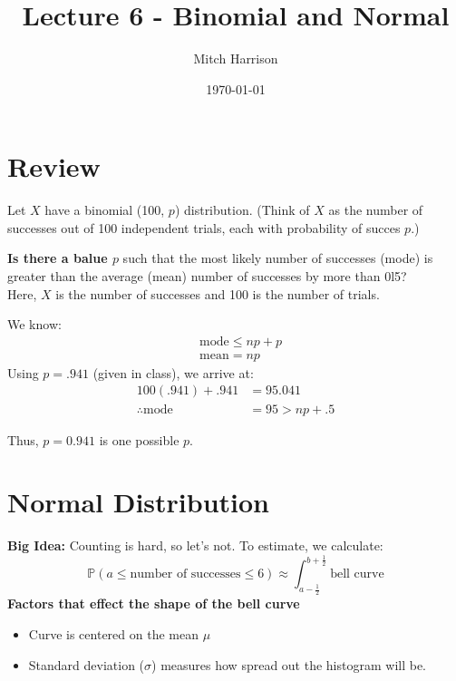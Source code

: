 \documentclass[titlepage, 12pt, leqno]{article}
\title{\Huge{Lecture 6 - Binomial and Normal}}
\author{\large{Mitch Harrison}}
\date{\today}
\begin{document}
\setlength{\parskip}{1\baselineskip}
\setlength{\parindent}{15pt}
\maketitle
\tableofcontents
\newpage


\section{Review}
\begin{ex}
    Let $X$ have a binomial (100, $p$) distribution. (Think of $X$ as the number of successes out of 100 independent trials, each with probability of succes $p$.)

    \textbf{Is there a balue $p$} such that the most likely number of successes (mode) is greater than the average (mean) number of successes by more than 0l5?\\[.1in]
   Here, $X$ is the number of successes and 100 is the number of trials. 
   
   We know:
  \begin{align*}
      &\text{mode} \le np+p \\
      &\text{mean} = np
  \end{align*}
  Using $p = .941$ (given in class), we arrive at:
    \begin{align*}
     100(.941) + .941 &= 95.041 \\
     \therefore \text{mode} &= 95 > np + .5
    \end{align*}
    
    Thus, $\boxed{p = 0.941}$ is one possible $p$.
\end{ex}

\pagebreak
\section{Normal Distribution}
\textbf{Big Idea:} Counting is hard, so let's not.
To estimate, we calculate:
\[
\mathbb{P}(a \le \text{number of successes} \le 6) \approx \int_{a-\frac{1}{2} }^{b + \frac{1}{2} } \text{bell curve}
\]
\textbf{Factors that effect the shape of the bell curve} 
\begin{itemize}
    \item Curve is centered on the mean $\mu$ 
    \item Standard deviation ($\sigma$) measures how spread out the histogram will be.
\end{itemize}
\end{document}
